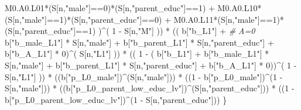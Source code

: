 \documentclass[
]{book}
\newenvironment{Shaded}{\begin{snugshade}}{\end{snugshade}}
\newcommand{\CommentTok}[1]{\textcolor[rgb]{0.56,0.35,0.01}{\textit{#1}}}
\newcommand{\DecValTok}[1]{\textcolor[rgb]{0.00,0.00,0.81}{#1}}
\newcommand{\NormalTok}[1]{#1}
\newcommand{\SpecialCharTok}[1]{\textcolor[rgb]{0.00,0.00,0.00}{#1}}
\newcommand{\StringTok}[1]{\textcolor[rgb]{0.31,0.60,0.02}{#1}}
\begin{document}
\begin{Shaded}
\begin{Highlighting}[]
\NormalTok{          M0.A0.L01}\SpecialCharTok{*}\NormalTok{(S[n,}\StringTok{"male"}\NormalTok{]}\SpecialCharTok{==}\DecValTok{0}\NormalTok{)}\SpecialCharTok{*}\NormalTok{(S[n,}\StringTok{"parent\_educ"}\NormalTok{]}\SpecialCharTok{==}\DecValTok{1}\NormalTok{) }\SpecialCharTok{+}
\NormalTok{          M0.A0.L10}\SpecialCharTok{*}\NormalTok{(S[n,}\StringTok{"male"}\NormalTok{]}\SpecialCharTok{==}\DecValTok{1}\NormalTok{)}\SpecialCharTok{*}\NormalTok{(S[n,}\StringTok{"parent\_educ"}\NormalTok{]}\SpecialCharTok{==}\DecValTok{0}\NormalTok{) }\SpecialCharTok{+} 
\NormalTok{          M0.A0.L11}\SpecialCharTok{*}\NormalTok{(S[n,}\StringTok{"male"}\NormalTok{]}\SpecialCharTok{==}\DecValTok{1}\NormalTok{)}\SpecialCharTok{*}\NormalTok{(S[n,}\StringTok{"parent\_educ"}\NormalTok{]}\SpecialCharTok{==}\DecValTok{1}\NormalTok{) )}\SpecialCharTok{\^{}}\NormalTok{( }\DecValTok{1} \SpecialCharTok{{-}}\NormalTok{ S[n,}\StringTok{"M"}\NormalTok{] )) }\SpecialCharTok{*}
\NormalTok{      (( b[}\StringTok{"b\_L1"}\NormalTok{] }\SpecialCharTok{+}                                                            \CommentTok{\# A=0}
\NormalTok{           b[}\StringTok{"b\_male\_L1"}\NormalTok{] }\SpecialCharTok{*}\NormalTok{ S[n,}\StringTok{"male"}\NormalTok{] }\SpecialCharTok{+}  
\NormalTok{           b[}\StringTok{"b\_parent\_L1"}\NormalTok{] }\SpecialCharTok{*}\NormalTok{ S[n,}\StringTok{"parent\_educ"}\NormalTok{] }\SpecialCharTok{+}
\NormalTok{           b[}\StringTok{"b\_A\_L1"}\NormalTok{] }\SpecialCharTok{*} \DecValTok{0}\NormalTok{)}\SpecialCharTok{\^{}}\NormalTok{( S[n,}\StringTok{"L1"}\NormalTok{] )) }\SpecialCharTok{*}
\NormalTok{      (( }\DecValTok{1} \SpecialCharTok{{-}}\NormalTok{ ( b[}\StringTok{"b\_L1"}\NormalTok{] }\SpecialCharTok{+}
\NormalTok{                 b[}\StringTok{"b\_male\_L1"}\NormalTok{] }\SpecialCharTok{*}\NormalTok{ S[n,}\StringTok{"male"}\NormalTok{] }\SpecialCharTok{+}  
\NormalTok{                 b[}\StringTok{"b\_parent\_L1"}\NormalTok{] }\SpecialCharTok{*}\NormalTok{ S[n,}\StringTok{"parent\_educ"}\NormalTok{] }\SpecialCharTok{+}
\NormalTok{                 b[}\StringTok{"b\_A\_L1"}\NormalTok{] }\SpecialCharTok{*} \DecValTok{0}\NormalTok{))}\SpecialCharTok{\^{}}\NormalTok{( }\DecValTok{1} \SpecialCharTok{{-}}\NormalTok{ S[n,}\StringTok{"L1"}\NormalTok{] )) }\SpecialCharTok{*}
\NormalTok{      ((b[}\StringTok{"p\_L0\_male"}\NormalTok{])}\SpecialCharTok{\^{}}\NormalTok{(S[n,}\StringTok{"male"}\NormalTok{])) }\SpecialCharTok{*} 
\NormalTok{      ((}\DecValTok{1} \SpecialCharTok{{-}}\NormalTok{ b[}\StringTok{"p\_L0\_male"}\NormalTok{])}\SpecialCharTok{\^{}}\NormalTok{(}\DecValTok{1} \SpecialCharTok{{-}}\NormalTok{ S[n,}\StringTok{"male"}\NormalTok{])) }\SpecialCharTok{*} 
\NormalTok{      ((b[}\StringTok{"p\_L0\_parent\_low\_educ\_lv"}\NormalTok{])}\SpecialCharTok{\^{}}\NormalTok{(S[n,}\StringTok{"parent\_educ"}\NormalTok{])) }\SpecialCharTok{*}
\NormalTok{      ((}\DecValTok{1} \SpecialCharTok{{-}}\NormalTok{ b[}\StringTok{"p\_L0\_parent\_low\_educ\_lv"}\NormalTok{])}\SpecialCharTok{\^{}}\NormalTok{(}\DecValTok{1} \SpecialCharTok{{-}}\NormalTok{ S[n,}\StringTok{"parent\_educ"}\NormalTok{])) }
\NormalTok{    \}}
  

\end{Highlighting}
\end{Shaded}
\end{document}
